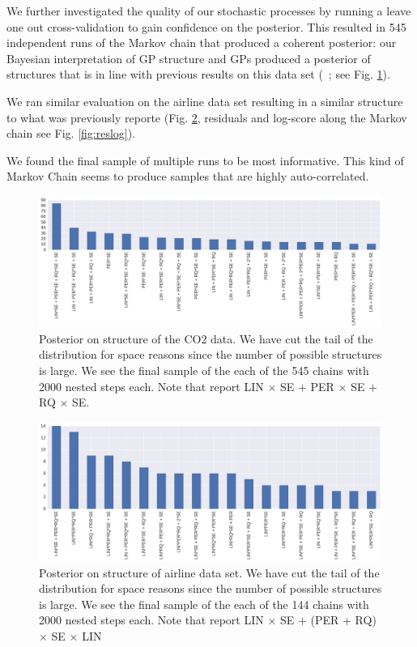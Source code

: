 \documentclass{article} %
\begin{document}
We further investigated the quality of our stochastic processes by running a leave one out cross-validation to gain confidence on the posterior. This resulted in 545 independent runs of the Markov chain that produced a coherent posterior: our Bayesian interpretation of GP structure and GPs produced a posterior of structures that is in line with previous results on this data set (~\citealp*{duvenaud2013structure}; see Fig. \ref{fig:structureCo2}).

We ran similar evaluation on the airline data set resulting in a similar structure to what was previously reporte (Fig. \ref{fig:structureAir}, residuals and log-score along the Markov chain see Fig. \ref{fig:reslog}).

We found the final sample of multiple runs to be most informative. This kind of Markov Chain seems to produce samples that are highly auto-correlated.

\begin{figure}
\centering
    \includegraphics[width=\textwidth]{figs/structureCo2b.png}
    \caption{Posterior on structure of the CO2 data. We have cut the tail of the distribution for space reasons since the number of possible structures is large. We see the final sample of the each of the 545 chains with 2000 nested steps each. Note that \citet{duvenaud2013structure} report LIN $\times$ SE $+$ PER $\times$ SE $+$ RQ $\times$ SE.}\label{fig:structureCo2}
\end{figure}

\begin{figure}
\centering
    \includegraphics[width=\textwidth]{figs/structureAirlinec.png}
    \caption{Posterior on structure of airline data set. We have cut the tail of the distribution for space reasons since the number of possible structures is large. We see the final sample of the each of the 144 chains with 2000 nested steps each. Note that \citet{duvenaud2013structure} report LIN $\times$ SE $+$ (PER  + RQ) $\times$ SE $\times$ LIN}\label{fig:structureAir}
\end{figure}
\end{document}
